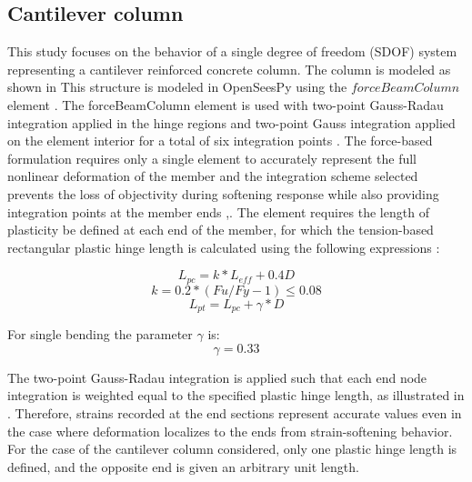 \subsection{Cantilever column}
This study focuses on the behavior of a single degree of freedom (SDOF) system representing a cantilever reinforced concrete column. The column is modeled as shown in  This structure is modeled in OpenSeesPy \cite{McKenna2010}\cite{Zhu2018} using the $forceBeamColumn$ element \cite{Scott}. The forceBeamColumn element is used with two-point Gauss-Radau integration applied in the hinge regions and two-point Gauss integration applied on the element interior for a total of six integration points \cite{Scott}. The force-based formulation requires only a single element to accurately represent the full nonlinear deformation of the member and the integration scheme selected prevents the loss of objectivity during softening response while also providing integration points at the member ends \cite{Calabrese2010},\cite{Scott}. The element requires the length of plasticity be defined at each end of the member, for which the tension-based rectangular plastic hinge length is calculated using the following expressions \cite{Goodnight2013}:

\begin{equation}
    L_{pc}=k*L_{eff} + 0.4D
    \label{eq:LP_Comp}
\end{equation}
\begin{equation}
	k=0.2*(Fu/Fy - 1) \leqslant 0.08
	\label{eq:K_Lp}
\end{equation}
\begin{equation}
    L_{pt}=L_{pc}+\gamma*D
    \label{eq:LP_Tension}
\end{equation}

For single bending the parameter $\gamma$ is:
\begin{equation}
    \gamma=0.33
    \label{eq:Gamma_LPt}
\end{equation}

The two-point Gauss-Radau integration is applied such that each end node integration is weighted equal to the specified plastic hinge length, as illustrated in . Therefore, strains recorded at the end sections represent accurate values even in the case where deformation localizes to the ends from strain-softening behavior. For the case of the cantilever column considered, only one plastic hinge length is defined, and the opposite end is given an arbitrary unit length. 

